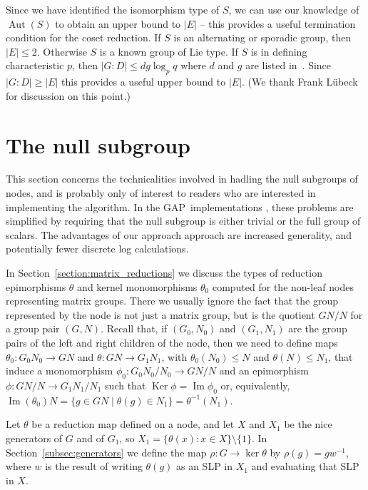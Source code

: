 \documentclass[12pt,twoside,reqno,psamsfonts]{amsproc}
\newcommand{\comment}[1]{\marginpar{\begin{center}\scriptsize{#1}\end{center}}}
\newcommand{\nullsubgp}{{null subgroup}\xspace}
\numberwithin{equation}{section}
\numberwithin{figure}{section}
\newcounter{algorithm}
\theoremstyle{plain}
\theoremstyle{definition}
\theoremstyle{remark}
\providecommand{\abs}[1]{\left\lvert #1 \right\rvert}
\newcommand{\GAP}{\textsf{GAP}}
\DeclareMathOperator{\Aut}{Aut}
\DeclareMathOperator{\Ker}{Ker}
\DeclareMathOperator{\Imm}{Im}
\begin{document}
Since we have identified the isomorphism type of $S$,
we can use our knowledge of $\Aut(S)$ to obtain an upper bound to $|E|$
-- this provides a useful termination condition for the coset reduction. 
If $S$ is an alternating or sporadic group, then $|E| \leqslant 2$.
Otherwise $S$ is a known group of Lie type. 
If $S$ is in defining characteristic $p$, then 
$\abs{G : D} \leqslant dg \log_p q$ where $d$ and $g$ are listed
in~\cite[Table 5, p. xvi]{atlas}. 
Since $\abs{G : D} \geqslant \abs{E}$ this provides a useful 
upper bound to $|E|$.
(We thank Frank L\"ubeck for discussion on this point.) 

\section{The \nullsubgp}
\label{section:scalars}
This section concerns the technicalities involved in hadling the null subgroups
\comment{DFH: added this paragraph}
of nodes, and is probably only of interest to readers who are interested in
implementing the algorithm. In the \GAP\ implementations \cite{recogbase,recog},
these problems are simplified by requiring that the null subgroup is either
trivial or the full group of scalars. The advantages of our approach approach
are increased generality, and potentially fewer discrete log calculations.

In Section~\ref{section:matrix_reductions}
we discuss the types of reduction epimorphisms $\theta$ and kernel
monomorphisms $\theta_0$ computed for the non-leaf nodes
representing matrix groups.  There we usually ignore the
fact that the group represented by the node is not just a matrix
group, but is the quotient $GN/N$ for a group pair $(G,N)$.
Recall that, if $(G_0,N_0)$ and $(G_1,N_1)$ are the group pairs of the left
and right children of the node, then we need to define maps $\theta_0:G_0N_0
\rightarrow GN$ and $\theta:GN \to G_1N_1$, with $\theta_0(N_0) \leqslant
N$ and $ \theta(N) \leqslant N_1$, that induce
a monomorphism $\phi_0 : G_0N_0/N_0 \to GN/N$ and an epimorphism
$\phi:GN/N \to G_1N_1/N_1$ such that $\Ker \phi = \Imm \phi_0$ or,
equivalently, $\Imm(\theta_0)N = \{g \in GN \mid \theta(g) \in N_1 \} =
\theta^{-1}(N_1)$.

Let $\theta$ be a reduction map defined on a node, and
let $X$ and $X_1$ be the nice generators of $G$ and of $G_1$, 
so $X_1 = \{  \theta(x) : x \in X\} \setminus \{1\}$.
In Section~\ref{subsec:generators} we define the 
map $\rho:G \to \ker \theta$ by $\rho(g) = g w^{-1}$, where $w$ is the
result of writing $\theta(g)$ as an SLP in $X_1$ and evaluating that
SLP in $X$.
\end{document}
